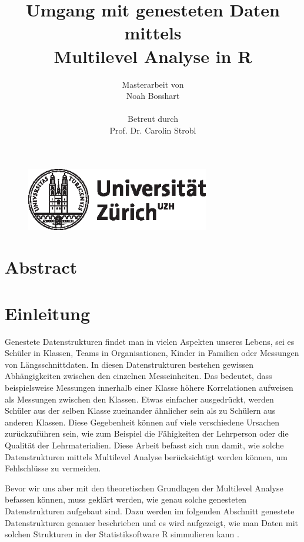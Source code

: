\documentclass[12pt]{article}\usepackage[]{graphicx}\usepackage[]{color}
\title{Umgang mit genesteten Daten mittels \\ Multilevel Analyse in R}
\author{Masterarbeit von \\ Noah Bosshart \\ \\ Betreut durch \\ Prof. Dr. Carolin Strobl}
\begin{document}
\begin{figure}[t]
  \centering
  \includegraphics[width = 8cm]{uzh_logo}
\end{figure}

\maketitle

\newpage
\tableofcontents

\newpage
\section{Abstract}

\newpage

\section{Einleitung}
Genestete Datenstrukturen findet man in vielen Aspekten unseres Lebens, sei es Schüler in Klassen, Teams in Organisationen, Kinder in Familien oder Messungen von Längsschnittdaten. In diesen Datenstrukturen bestehen gewissen Abhängigkeiten zwischen den einzelnen Messeinheiten. Das bedeutet, dass beispielsweise Messungen innerhalb einer Klasse höhere Korrelationen aufweisen als Messungen zwischen den Klassen. Etwas einfacher ausgedrückt, werden Schüler aus der selben Klasse zueinander ähnlicher sein als zu Schülern aus anderen Klassen. Diese Gegebenheit können auf viele verschiedene Ursachen zurückzuführen sein, wie zum Beispiel die Fähigkeiten der Lehrperson oder die Qualität der Lehrmaterialien. Diese Arbeit befasst sich nun damit, wie solche Datenstrukturen  mittels Multilevel Analyse berücksichtigt werden können, um Fehlschlüsse zu vermeiden.

Bevor wir uns aber mit den theoretischen Grundlagen der Multilevel Analyse befassen können, muss geklärt werden, wie genau solche genesteten Datenstrukturen aufgebaut sind. Dazu werden im folgenden Abschnitt genestete Datenstrukturen genauer beschrieben und es wird aufgezeigt, wie man Daten mit solchen Strukturen in der Statistiksoftware R simmulieren kann \cite{R}.
\end{document}
